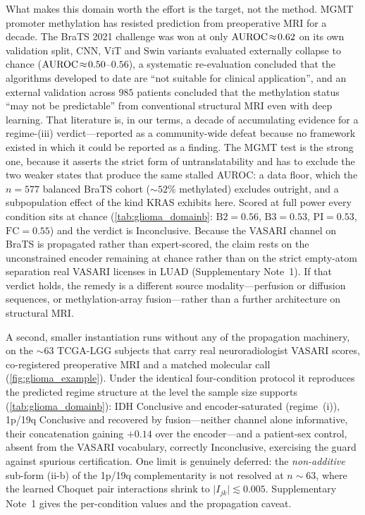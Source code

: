 What makes this domain worth the effort is the target, not the
method.
MGMT promoter methylation has resisted prediction from preoperative
MRI for a decade. The BraTS 2021 challenge was won at only
$\text{AUROC}\!\approx\!0.62$ on its own validation split, CNN, ViT and Swin
variants evaluated externally collapse to chance
($\text{AUROC}\!\approx\!0.50$--$0.56$),\cite{baid2021brats,saeed2023mgmt} a systematic
re-evaluation concluded that the algorithms developed to date are
``not suitable for clinical application'',\cite{robinet2023mgmt} and
an external validation across $985$ patients concluded that the
methylation status ``may not be predictable'' from conventional
structural MRI even with deep
learning.\cite{kim2022mgmtvalidation}
That literature is, in our terms, a decade of accumulating evidence
for a regime-(iii) verdict---reported as a community-wide defeat
because no framework existed in which it could be reported as a
finding.
The MGMT test is the strong one, because it asserts the strict form of
untranslatability and has to exclude the two weaker states that produce the
same stalled AUROC: a data floor, which the $n\!=\!577$ balanced BraTS
cohort (${\sim}52\%$ methylated) excludes outright, and a subpopulation
effect of the kind KRAS exhibits here.
Scored at full power every condition sits at chance
(\cref{tab:glioma_domainb}: $\mathrm{B2}\!=\!0.56$, $\mathrm{B3}\!=\!0.53$,
$\mathrm{PI}\!=\!0.53$, $\mathrm{FC}\!=\!0.55$) and the verdict is
Inconclusive.
Because the VASARI channel on BraTS is propagated rather than expert-scored,
the claim rests on the unconstrained encoder remaining at chance rather than
on the strict empty-atom separation real VASARI licenses in LUAD
(Supplementary Note~1).
If that verdict holds, the remedy is a different source
modality---perfusion or diffusion sequences, or methylation-array
fusion---rather than a further architecture on structural MRI.

A second, smaller instantiation runs without any of the propagation
machinery, on the ${\sim}63$ TCGA-LGG subjects that carry real
neuroradiologist VASARI scores, co-registered preoperative MRI and a matched
molecular call (\cref{fig:glioma_example}). Under the identical
four-condition protocol it reproduces the predicted regime structure at the
level the sample size supports (\cref{tab:glioma_domainb}): IDH Conclusive
and encoder-saturated (regime~(i)), 1p/19q Conclusive and recovered by
fusion---neither channel alone informative, their concatenation gaining
$+0.14$ over the encoder---and a patient-sex control, absent from the VASARI
vocabulary, correctly Inconclusive, exercising the guard against spurious
certification. One limit is genuinely deferred: the \emph{non-additive}
sub-form (ii-b) of the 1p/19q complementarity is not resolved at
$n\!\sim\!63$, where the learned Choquet pair interactions shrink to
$\lvert I_{jk}\rvert\!\lesssim\!0.005$. Supplementary Note~1 gives the
per-condition values and the propagation caveat.

